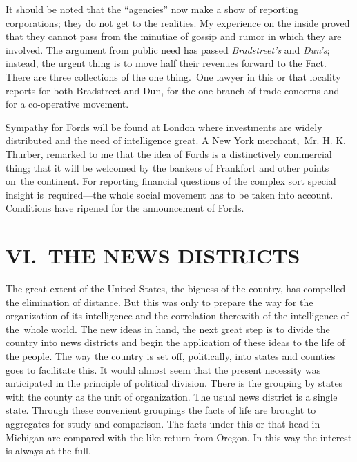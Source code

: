 \documentclass[openany,nobib]{tufte-book}
\begin{document}
It should be noted that the ``agencies'' now make a show of reporting
corporations; they do not get to the realities. My experience on the
inside proved that they cannot pass from the minutiae of gossip and
rumor in which they are involved. The argument from public need has
passed \emph{Bradstreet's} and \emph{Dun's}; instead, the urgent thing
is to move half their revenues forward to the Fact. There are three
collections of the one thing.~One lawyer in this or that locality
reports for both Bradstreet and Dun, for the one-branch-of-trade
concerns and for a co-operative movement.~

Sympathy for Fords will be found at London where investments are widely
distributed and the need of intelligence great. A New York merchant,~Mr.
H. K. Thurber, remarked to me that the idea of Fords is a distinctively
commercial thing; that it will be welcomed by the bankers of Frankfort
and other points on~the continent. For reporting financial questions of
the complex sort special insight is~required---the whole social movement
has to be taken into account. Conditions have ripened for the
announcement of Fords.~

\hypertarget{vi-the-news-districts}{%
\section{VI.~THE NEWS DISTRICTS~}\label{vi-the-news-districts}}

The great extent of the United States, the bigness of the country, has
compelled the elimination of distance. But this was only to prepare the
way for the organization of its intelligence and the correlation
therewith of the intelligence of the~whole world. The new ideas in hand,
the next great step is to divide the country into news districts and
begin the application of these ideas to the life of the people. The way
the country is set off, politically, into states and counties goes to
facilitate this. It would almost seem that the present necessity was
anticipated in the principle of political division. There is the
grouping by states with the county as the unit of organization. The
usual news district is a single state. Through these convenient
groupings the facts of life are brought to aggregates for study and
comparison. The facts under this or that head in Michigan are compared
with the like return from Oregon. In this way the interest is always at
the full.~
\end{document}
